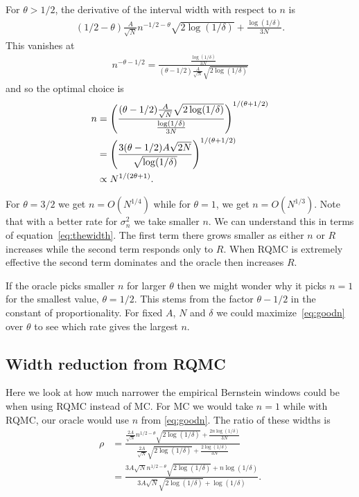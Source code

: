 \documentclass{article}
\begin{document}
For $\theta>1/2$, the derivative of the interval width with respect to $n$ is
\begin{align*}
(1/2-\theta)\frac{A}{\sqrt{N}}n^{-1/2-\theta}\sqrt{2\log(1/\delta)}  + \frac{\log(1/\delta)}{3N}.
\end{align*}
This vanishes at 
\begin{align*}
n^{-\theta-1/2} = 
\frac{\frac{\log(1/\delta)}{3N}}
{(\theta-1/2)\frac{A}{\sqrt{N}}
\sqrt{2\log(1/\delta)}}
\end{align*}
and so the optimal choice is
\begin{align}\label{eq:goodn}
n
& = 
\left(\frac
{(\theta-1/2)\frac{A}{\sqrt{N}}
\sqrt{2\log(1/\delta)}}{\frac{\log(1/\delta)}{3N}}\right)^{1/(\theta+1/2)}\notag\\
& = 
\left(\frac{3(\theta-1/2)A                                                                               \sqrt{2N}}{\sqrt{\log(1/\delta)}}\right)^{1/(\theta+1/2)}\\
  &\propto N^{1/(2\theta+1)}.\notag
\end{align}

For $\theta=3/2$ we get $n = O(N^{1/4})$
while for $\theta=1$, we get $n=O(N^{1/3})$.
Note that with a better rate for $\sigma^2_n$
we take smaller $n$. 
We can understand this in terms of equation~\eqref{eq:thewidth}.
The first term there grows smaller as either $n$ or $R$ increases
while the second term responds only to $R$.  When RQMC is extremely
effective the second term dominates and the oracle then increases $R$.

If the oracle picks smaller $n$ for larger $\theta$ then we might
wonder why it picks $n=1$ for the smallest value, $\theta=1/2$. 
This stems from the factor $\theta-1/2$ in the constant of proportionality.
For fixed $A$, $N$ and $\delta$ we could maximize~\eqref{eq:goodn} over $\theta$
to see which rate gives the largest $n$.

\subsection*{Width reduction from RQMC}

Here we look at how much narrower the empirical Bernstein windows
could be when using RQMC instead of MC.
For MC we would take $n=1$
while with RQMC, our oracle would use $n$ from \eqref{eq:goodn}.
The ratio of these widths is
\begin{align*}
\rho &=\frac{\frac{2A}{\sqrt{N}}n^{1/2-\theta}\sqrt{2\log(1/\delta)}  + \frac{2n\log(1/\delta)}{3N}}{
\frac{2A}{\sqrt{N}}\sqrt{2\log(1/\delta)}  + \frac{2\log(1/\delta)}{3N}}\\
&=\frac{3A\sqrt{N}n^{1/2-\theta}\sqrt{2\log(1/\delta)}  + n\log(1/\delta)}{
{3A}{\sqrt{N}}\sqrt{2\log(1/\delta)}  + \log(1/\delta)}.
\end{align*}
\end{document}
